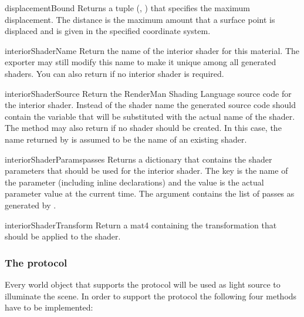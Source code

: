 \begin{methoddesc}[IMaterial]{displacementBound}{}
Returns a tuple (, ) that specifies the
maximum displacement. The distance is the maximum amount that a
surface point is displaced and is given in the specified coordinate
system.
\end{methoddesc}

\begin{methoddesc}[IMaterial]{interiorShaderName}{}
Return the name of the interior shader for this material. The exporter
may still modify this name to make it unique among all generated
shaders. You can also return  if no interior shader is required.
\end{methoddesc}

\begin{methoddesc}[IMaterial]{interiorShaderSource}{}
Return the RenderMan Shading Language source code for the interior shader.
Instead of the shader name the generated source code should contain
the variable  that will be substituted with the
actual name of the shader. The method may also return  if
no shader should be created. In this case, the name returned by
 is assumed to be the name of an existing 
shader.
\end{methoddesc}

\begin{methoddesc}[IMaterial]{interiorShaderParams}{passes}
Returns a dictionary that contains the shader parameters that should
be used for the interior shader. The key is the name of the parameter
(including inline declarations) and the value is the actual parameter
value at the current time. The  argument contains the list
of passes as generated by .
\end{methoddesc}

\begin{methoddesc}[IMaterial]{interiorShaderTransform}{}
Return a mat4 containing the transformation that should be applied to
the shader.
\end{methoddesc}


\subsubsection{The  protocol}

Every world object that supports the  protocol
will be used as light source to illuminate the scene. In order to 
support the  protocol the following four methods
have to be implemented:

